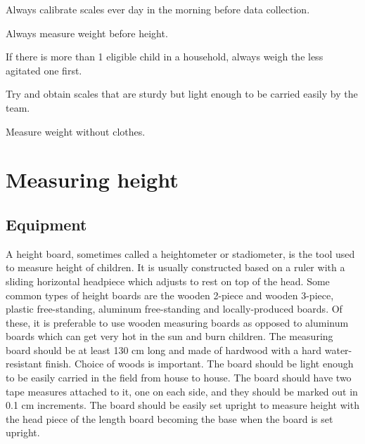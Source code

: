 \documentclass[12pt,]{book}
\theoremstyle{definition}
\theoremstyle{definition}
\theoremstyle{definition}
\theoremstyle{remark}
\let\BeginKnitrBlock\begin \let\EndKnitrBlock\end
\begin{document}
\BeginKnitrBlock{rmdremind}
\item 

Always calibrate scales ever day in the morning before data collection.

\item 

Always measure weight before height.

\item 

If there is more than 1 eligible child in a household, always weigh the
less agitated one first.

\item 

Try and obtain scales that are sturdy but light enough to be carried
easily by the team.

\item 

Measure weight without clothes.
\EndKnitrBlock{rmdremind}

\hypertarget{height}{%
\chapter{Measuring height}\label{height}}

\hypertarget{equipment-1}{%
\section{Equipment}\label{equipment-1}}

A height board, sometimes called a heightometer or stadiometer, is the
tool used to measure height of children. It is usually constructed based
on a ruler with a sliding horizontal headpiece which adjusts to rest on
top of the head. Some common types of height boards are the wooden
2-piece and wooden 3-piece, plastic free-standing, aluminum
free-standing and locally-produced boards. Of these, it is preferable to
use wooden measuring boards as opposed to aluminum boards which can get
very hot in the sun and burn children. The measuring board should be at
least 130 cm long and made of hardwood with a hard water-resistant
finish. Choice of woods is important. The board should be light enough
to be easily carried in the field from house to house. The board should
have two tape measures attached to it, one on each side, and they should
be marked out in 0.1 cm increments. The board should be easily set
upright to measure height with the head piece of the length board
becoming the base when the board is set upright.
\end{document}
